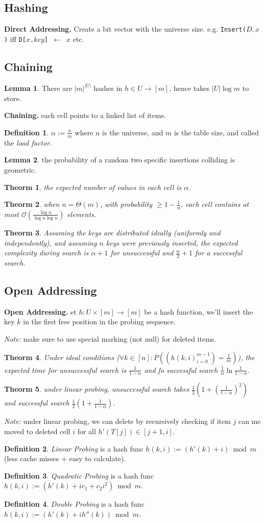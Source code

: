 \documentclass[]{article}
\newcommand\compactsubsection[1]        {\vspace{-10pt}\subsection{#1}\vspace{-5pt}}
\newcommand\compactsection   [1]        {\vspace{-10pt}\section{#1}\vspace{-5pt}}
\newcommand\subsectionrightaftersection {\vspace{10pt}}
\newcommand\oc    {\mathcal{O}}
\newcommand\set   {\ell et \text{ }}
\newcommand\co        {\colon}
\newcommand\ag        {\alpha}
\newcommand\logn      {\log n}
\newcommand\cl [1]    {\left ( #1 \right )}
\newtheorem{Theorem}{Theorm}
\theoremstyle{definition}
\newtheorem{Definition}{Definition}
\newtheorem{Lemma}{Lemma}
\newcommand\theo  [1] {\begin{Theorem}#1\end{Theorem}}
\newcommand\defi  [1] {\begin{Definition}#1\end{Definition}}
\newcommand\lem   [1] {\begin{Lemma}#1\end{Lemma}}
\begin{document}
\begin{multicols}{4}
		
		\compactsection{Hashing}\subsectionrightaftersection
			\textbf{Direct Addressing. }Create a bit vector with the universe size. e.g. \texttt{Insert($D, x$)} iff \texttt{D[$x$.$key$] $\gets$ $x$} etc. 
			\compactsubsection{Chaining}
				\lem{There are $|m|^{|U|}$ hashes in $h \in U \to [m]$, hence takes $|U|\log m$ to store. }
				\textbf{Chaining. }each cell points to a linked list of items. 
				\defi{$\ag := \frac{n}{m}$ where $n$ is the universe, and $m$ is the table size, and called the \textit{load factor}. }
				\lem{the probability of a random two specific insertions colliding is geometric. }
				\theo{the expected number of values in each cell is $\ag$. }
				\theo{when $n = \Theta(m)$, with probability $\ge 1 - \frac{1}{n}$, each cell contains at most $\oc\cl{\frac{\logn}{\logn\logn}}$ elements. }
				\theo{Assuming the keys are distributed ideally (uniformly and independently), and assuming $n$ keys were previously inserted, the expected complexity during search is $\ag + 1$ for unsuccessful and $\frac{\ag}{2} + 1$ for a successful search. }
			
			\compactsubsection{Open Addressing}
				\textbf{Open Addressing. }\set $h \co U \times [m] \to [m]$ be a hash function, we'll insert the key $k$ in the first free position in the probing sequence. 
				
				\textit{Note: }make sure to use special marking (not null) for deleted items.  
				
				\theo{Under ideal conditions ($\forall k \in [n] \co P\cl{(h(k, i)_{i = 0}^{m - 1}) = \frac{1}{m}}$), the expected time for unsuccessful search is $\frac{1}{1 - \ag}$ and fo successful search $\frac{1}{\ag} \ln \frac{1}{1 - \ag}$. } 
				
				\theo{under linear probing, unsuccessful search takes $\frac{1}{2}\cl{1 + \cl{\frac{1}{1 - \ag}}^2}$ and successful search $\frac{1}{2}\cl{1 + \frac{1}{1 - \ag}}$. }
				\textit{Note: }under linear probing, we can delete by recursively checking if item $j$ can me moved to deleted cell $i$ for all $h'(T[j]) \in [j + 1, i]$. 
				
				\defi{\textit{Linear Probing} is a hash func $h(k, i) := (h'(k) + i) \bmod m$ (less cache misses + easy to calculate). }
				\defi{\textit{Quadratic Probing} is a hash func $h(k, i) := (h'(k) + ic_1 + c_2i^2) \bmod m$. }
				\defi{\textit{Double Probing} is a hash func $h(k, i) := (h'(k) + ih''(k)) \bmod m$. }
			

\end{multicols}
\end{document}

